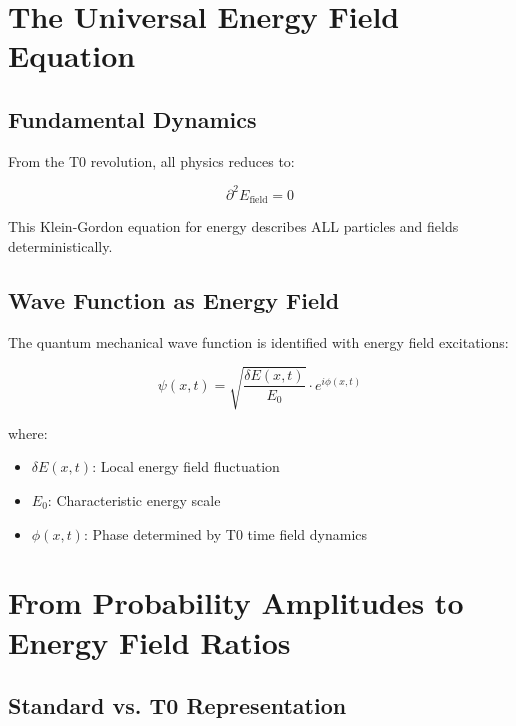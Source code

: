 \documentclass[12pt,a4paper]{report}
\begin{document}
	\section{The Universal Energy Field Equation}
	\label{sec:universal_field_equation}
	
	\subsection{Fundamental Dynamics}
	\label{subsec:fundamental_dynamics}
	
	From the T0 revolution, all physics reduces to:
	
	\begin{equation}
		\boxed{\partial^2 E_{\text{field}} = 0}
		\label{eq:universal_field_equation}
	\end{equation}
	
	This Klein-Gordon equation for energy describes ALL particles and fields deterministically.
	
	\subsection{Wave Function as Energy Field}
	\label{subsec:wave_function_energy_field}
	
	The quantum mechanical wave function is identified with energy field excitations:
	
	\begin{equation}
		\psi(x,t) = \sqrt{\frac{\delta E(x,t)}{E_0}} \cdot e^{i\phi(x,t)}
		\label{eq:wave_function_energy}
	\end{equation}
	
	where:
	\begin{itemize}
		\item $\delta E(x,t)$: Local energy field fluctuation
		\item $E_0$: Characteristic energy scale
		\item $\phi(x,t)$: Phase determined by T0 time field dynamics
	\end{itemize}
	
	\section{From Probability Amplitudes to Energy Field Ratios}
	\label{sec:amplitudes_to_ratios}
	
	\subsection{Standard vs. T0 Representation}
	\label{subsec:standard_vs_t0}
	
\end{document}
